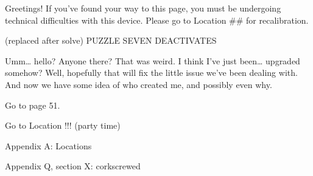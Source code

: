 \documentclass[14pt]{extbook}
\begin{document}
\vspace*{\fill}
\vspace*{\fill}
\newpage

\vspace*{\fill}
\vspace*{\fill}
\newpage

\vspace*{\fill}
\vspace*{\fill}
\newpage

\vspace*{\fill}
\vspace*{\fill}
\newpage

\vspace*{\fill}
Greetings! If you’ve found your way to this page, you must be undergoing technical difficulties with this device. Please go to Location \#\# for recalibration.

(replaced after solve)
PUZZLE SEVEN
DEACTIVATES

Umm… hello? Anyone there? That was weird. I think I’ve just been… upgraded somehow? Well, hopefully that will fix the little issue we’ve been dealing with. And now we have some idea of who created me, and possibly even why.

Go to page 51.
\vspace*{\fill}
\newpage

\vspace*{\fill}
\vspace*{\fill}
\newpage

\vspace*{\fill}
\vspace*{\fill}
\newpage

\vspace*{\fill}
\vspace*{\fill}
\newpage

\vspace*{\fill}
\vspace*{\fill}
\newpage

\vspace*{\fill}
\vspace*{\fill}
\newpage

\vspace*{\fill}
Go to Location !!! (party time)
\vspace*{\fill}
\newpage

\vspace*{\fill}
Appendix A: Locations



Appendix Q, section X:
corkscrewed
\vspace*{\fill}
\newpage
\end{document}
